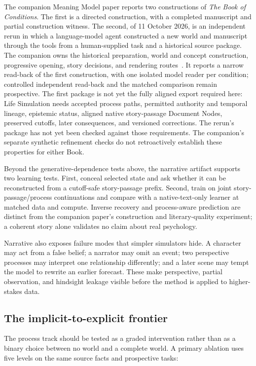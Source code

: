 \documentclass[10pt]{article}
\newcommand{\Book}{\textit{The Book of Conditions}}
\begin{document}
The companion Meaning Model paper reports two constructions of \Book{}. The
first is a directed construction, with a completed manuscript and partial
construction witness. The second, of 11 October 2026, is an independent rerun
in which a language-model agent constructed a new world and manuscript through
the tools from a human-supplied task and a historical source package. The
companion owns the historical preparation, world and concept construction,
progressive opening, story decisions, and rendering
routes~\cite{westerbergMeaning2026}. It reports a narrow read-back of the first
construction, with one isolated model reader per condition; controlled
independent read-back and the matched comparison remain prospective. The first
package is not yet the fully aligned
export required here: Life Simulation
needs accepted process paths, permitted authority and temporal lineage,
epistemic status, aligned native story-passage Document Nodes, preserved
cutoffs, later consequences, and versioned corrections. The rerun's package
has not yet been checked against those requirements. The companion's
separate synthetic refinement checks do not retroactively establish these
properties for either Book.

Beyond the generative-dependence tests above, the narrative artifact supports
two learning tests. First, conceal selected state and ask whether it can be
reconstructed from a cutoff-safe story-passage prefix. Second, train on joint
story-passage/process continuations and compare with a native-text-only learner
at matched data and compute. Inverse recovery and process-aware prediction
are distinct from the companion paper's construction and literary-quality
experiment; a coherent story alone validates no claim about real psychology.

Narrative also exposes failure modes that simpler simulators hide. A character
may act from a false belief; a narrator may omit an event; two perspective processes may
interpret one relationship differently; and a later scene may tempt the model
to rewrite an earlier forecast. These make perspective, partial observation,
and hindsight leakage visible before the method is applied to higher-stakes
data.

\subsection{The implicit-to-explicit frontier}
\label{sec:representation-controls}

The process track should be tested as a graded intervention rather than as a
binary choice between no world and a complete world. A primary ablation uses
five levels on the same source facts and prospective tasks:
\end{document}
